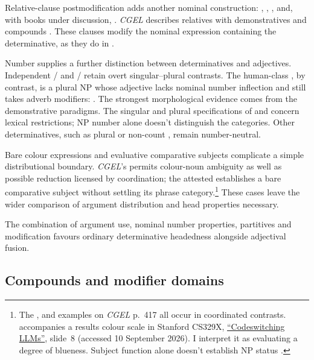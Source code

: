 \documentclass[12pt]{article}
\begin{document}
Relative-clause postmodification adds another nominal construction: , , , and, with books under discussion, . \textit{CGEL} describes relatives with demonstratives and compounds \citep[414, 422--423]{huddleston2002}. These clauses modify the nominal expression containing the determinative, as they do in .

Number supplies a further distinction between determinatives and adjectives. Independent /\allowbreak{} and /\allowbreak{} retain overt singular--plural contrasts. The human-class , by contrast, is a plural NP whose adjective lacks nominal number inflection and still takes adverb modifiers:  \citep[418]{huddleston2002}. The strongest morphological evidence comes from the demonstrative paradigms. The singular and plural specifications of  and  concern lexical restrictions; NP number alone doesn't distinguish the categories. Other determinatives, such as plural or non-count , remain number-neutral.

Bare colour expressions and evaluative comparative subjects complicate a simple distributional boundary. \textit{CGEL}'s  permits colour-noun ambiguity as well as possible reduction licensed by coordination; the attested  establishes a bare comparative subject without settling its phrase category.\footnote{The ,  and  examples on \textit{CGEL} p.~417 all occur in coordinated contrasts.  accompanies a results colour scale in Stanford CS329X, \href{https://web.stanford.edu/class/cs329x/slides/Lecture12_B_Codeswitching\%20LLMs.pdf}{\enquote{Codeswitching LLMs}}, slide~8 (accessed 10 September 2026). I interpret it as evaluating a degree of blueness. Subject function alone doesn't establish NP status \citep[236]{huddleston2002}.} These cases leave the wider comparison of argument distribution and head properties necessary.

The combination of argument use, nominal number properties, partitives and modification favours ordinary determinative headedness alongside adjectival fusion.

\subsection{Compounds and modifier domains}\label{sec:compounds}
\end{document}
